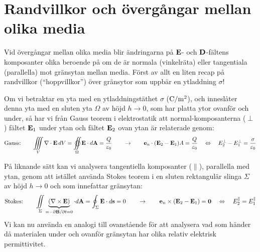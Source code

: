 {\section{Randvillkor och {\"o}verg{\aa}ngar mellan olika media}
Vid {\"o}verg{\aa}ngar mellan olika media blir {\"a}ndringarna p{\aa}
${\bf E}$- och ${\bf D}$-f{\"a}ltens komposanter olika bero\-ende p{\aa} om
de {\"a}r  normala (vinkelr{\"a}ta) eller tangentiala (parallella) mot
gr{\"a}nsytan mellan media.
\medskip
{}
\smallskip
\noindent
F{\"o}rst av allt en liten recap p{\aa} randvillkor (``hoppvillkor'') {\"o}ver
gr{\"a}nsytor som uppb{\"a}r en ytladdning $\sigma$!
\bigskip
\centerline{}
\medskip
\noindent
Om vi betraktar en yta med en ytladdningst{\"a}thet
$\sigma$ (${\rm C}/{\rm m}^2$), och innesl{\aa}ter denna yta med en sluten
yta
$\Omega$ av h{\"o}jd $h\to0$, som har platta ytor ovanf{\"o}r och under,
s{\aa} har vi fr{\aa}n Gauss teorem i elektrostatik att normal-komposanterna
($\perp$) f{\"a}ltet ${\bf E}_1$ under ytan och f{\"a}ltet ${\bf E}_2$ ovan
ytan {\"a}r relaterade genom:
$$
  \hbox{Gauss:}\qquad
  \displaystyle
  \iiint_V\nabla\cdot{\bf E}\,dV=
  \oiint_{\Omega}{\bf E}\cdot d{\bf A}={{Q}\over{\varepsilon_0}}
  \qquad\to\qquad
  {\bf e}_n \cdot({\bf E}_{2}-{\bf E}_{1})A
    ={{Q}\over{\varepsilon_0}}
  \quad\Leftrightarrow\quad
  E^{\perp}_2-E^{\perp}_1={{\sigma}\over{\varepsilon_0}}
$$
\bigskip
\centerline{}
\medskip
\noindent
P{\aa} liknande s{\"a}tt kan vi analysera tangentiella komposanter ($\parallel$), parallella med ytan, genom att ist{\"a}llet anv{\"a}nda Stokes teorem i en sluten rektangul{\"a}r slinga $\Sigma$ av h{\"o}jd $h\to0$ och som innefattar gr{\"a}nsytan:
$$
  \hbox{Stokes:}\qquad
  \iint_{\Sigma}\underbrace{(\nabla\times{\bf E})}_{=-\partial{\bf B}/\partial t=0}
      \cdot d{\bf A}
    =\oint_{\Sigma}{\bf E}\cdot d{\bf s}
    =0
  \qquad\to\qquad
  {\bf e}_n \times({\bf E}_{2}-{\bf E}_{1})={\bf 0}
  \quad\Leftrightarrow\quad
  E^{\parallel}_2=E^{\parallel}_1
$$
\vfill\eject
{}
\smallskip
\noindent
Vi kan nu anv{\"a}nda en analogi till ovanst{\aa}ende f{\"o}r att analysera vad som h{\"a}nder d{\aa} materialen under och ovanf{\"o}r gr{\"a}nsytan har olika relativ elektrisk permittivitet.
}
